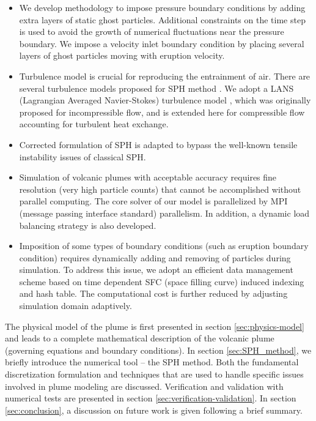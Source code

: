 \documentclass[journal abbreviation, manuscript]{copernicus}
\begin{document}
\begin{itemize}
\item We develop methodology to impose pressure boundary conditions by adding extra layers of static ghost particles. Additional constraints on the time step is used to avoid the growth of numerical fluctuations near the pressure boundary. We impose a velocity inlet boundary condition by placing several layers of ghost particles moving with eruption velocity. 
\item Turbulence model is crucial for reproducing the entrainment of air. There are several turbulence models proposed for SPH method \citep{issa2005numerical,violeau2007numerical}. We adopt a LANS (Lagrangian Averaged Navier-Stokes) turbulence model \citep{monaghan2011turbulence}, which was originally proposed for incompressible flow, and is extended here for compressible flow accounting for turbulent heat exchange. 
\item Corrected formulation of SPH \citep{chen1999improvement} is adapted to bypass the well-known tensile instability issues of classical SPH.
\item Simulation of volcanic plumes with acceptable accuracy requires fine resolution (very high particle counts) that cannot be accomplished without parallel computing. The core solver of our model is parallelized by MPI (message passing interface standard) parallelism. In addition, a dynamic load balancing strategy is also developed. 
\item Imposition of some types of boundary conditions (such as eruption boundary condition) requires dynamically adding and removing of particles during simulation. To address this issue, we adopt an efficient data management scheme based on time dependent SFC (space filling curve) induced indexing and hash table. The computational cost is further reduced by adjusting simulation domain adaptively.
\end{itemize}

The physical model of the plume is first presented in section \ref{sec:physics-model} and leads to a complete mathematical description of the volcanic plume (governing equations and boundary conditions). In section \ref{sec:SPH_method}, we  briefly introduce the numerical tool -- the SPH method. Both the fundamental discretization formulation and techniques that are used to handle specific issues involved in plume modeling are discussed. Verification and validation with numerical tests are presented in section \ref{sec:verification-validation}. In section \ref{sec:conclusion}, a discussion on future work is given following a brief summary.
\end{document}
